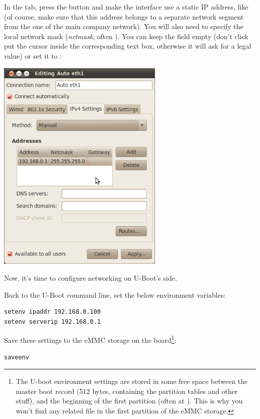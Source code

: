 In the  tab, press the  button and
make the interface use a static IP
address, like  (of course, make sure that this address
belongs to a separate network segment from the one of the main company
network). You will also need to specify the local network mask
(\emph{netmask}, often ). You can keep the
 field empty (don't click put the cursor inside the
corresponding text box, otherwise it will ask for a legal value)
or set it to :

\begin{center}
\includegraphics[width=8cm]{labs/kernel-board-setup/network-config-3.png}
\end{center}

Now, it's time to configure networking on U-Boot's side.

Back to the U-Boot command line, set the below environment variables:

\begin{verbatim}
setenv ipaddr 192.168.0.100
setenv serverip 192.168.0.1
\end{verbatim}

Save these settings to the eMMC storage on the board\footnote{
The U-boot environment settings are stored in some free space
between the master boot record (512 bytes, containing the partition
tables and other stuff), and the beginning of the first partition (often
at ). This is why you won't find any related file in the
first partition of the eMMC storage.}:

\begin{verbatim}
saveenv
\end{verbatim}

